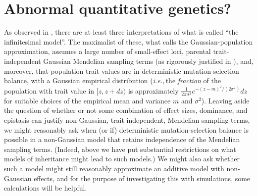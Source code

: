 \documentclass{article}
\newcommand{\ie}{\textit{i.e.,}\,}
\newcommand{\1}{\mathbbm{1}}
\theoremstyle{remark}
\theoremstyle{definition}
\begin{document}
\section{Abnormal quantitative genetics?}

As observed in \cite{turelli2017commentary}, 
there are at least three interpretations of what is called ``the infinitesimal model''.  The maximalist of these, what \cite{turelli2017commentary} calls the Gaussian-population approximation, assumes a large number of small-effect loci,  parental trait-independent Gaussian Mendelian sampling terms  (as rigorously justified in \cite{barton2017infinitesimal,barton2022infinitesimal}), and, moreover, that  population trait values are in deterministic mutation-selection balance, with a Gaussian empirical distribution
(\ie the \emph{fraction} of the population with trait value in $[z,z+dz)$
is approximately $\frac{1}{2\pi\sigma^{2}} e^{-(z-m)^{2}/(2\sigma^{2})} dz$
for suitable choices of the empirical mean and variance $m$ and $\sigma^{2}$).
Leaving aside
the question of whether or not some combination of effect sizes, dominance, and epistasis can justify non-Gaussian, trait-independent,  Mendelian sampling terms, we might reasonably ask when (or if)
deterministic mutation-selection balance is possible in a non-Gaussian model
that retains independence of the Mendelian sampling terms.
(Indeed, above we have put substantial restrictions on what models of inheritance
might lead to such models.)
We might also ask whether such a model
might still reasonably approximate an additive model with non-Gaussian effects,
and for the purpose of investigating this with simulations,
some calculations will be helpful.
\end{document}

